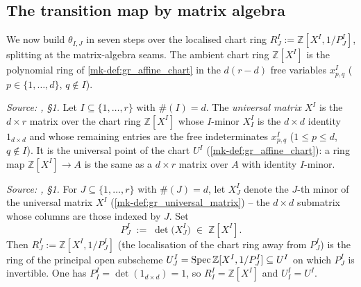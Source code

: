 \subsection*{The transition map by matrix algebra}

We now build \(\theta_{I,J}\) in seven steps over the localised chart ring
\(R^I_J := \mathbb{Z}[X^I, 1/P^I_J]\), splitting at the matrix-algebra seams. The
ambient chart ring \(\mathbb{Z}[X^I]\) is the polynomial ring of
\ref{mk-def:gr_affine_chart} in the \(d(r-d)\) free variables \(x^I_{p,q}\)
(\(p \in \{1,\dots,d\}\), \(q \notin I\)).

\begin{definition}\label{mk-def:gr_universal_matrix}
  \leanok

  \textit{Source: \cite{nitsure-hilbert-quot}, \S 1.}
  Let \(I \subseteq \{1,\dots,r\}\) with \(\#(I) = d\). The \emph{universal
  matrix} \(X^I\) is the \(d \times r\) matrix over the chart ring
  \(\mathbb{Z}[X^I]\) whose \(I\)-minor \(X^I_I\) is the \(d \times d\) identity
  \(1_{d\times d}\) and whose remaining entries are the free indeterminates
  \(x^I_{p,q}\) (\(1 \le p \le d\), \(q \notin I\)). It is the universal point of
  the chart \(U^I\) (\ref{mk-def:gr_affine_chart}): a ring map
  \(\mathbb{Z}[X^I] \to A\) is the same as a \(d \times r\) matrix over \(A\)
  with identity \(I\)-minor.
\end{definition}

\begin{definition}\label{mk-def:gr_minor_det}
  \leanok

  \textit{Source: \cite{nitsure-hilbert-quot}, \S 1.}
  For \(J \subseteq \{1,\dots,r\}\) with \(\#(J) = d\), let \(X^I_J\) denote the
  \(J\)-th minor of the universal matrix \(X^I\) (\ref{mk-def:gr_universal_matrix})
  -- the \(d \times d\) submatrix whose columns are those indexed by \(J\). Set
  \[
    P^I_J \;:=\; \det\bigl(X^I_J\bigr) \;\in\; \mathbb{Z}[X^I].
  \]
  Then \(R^I_J := \mathbb{Z}[X^I, 1/P^I_J]\) (the localisation of the chart ring
  away from \(P^I_J\)) is the ring of the principal open subscheme
  \(U^I_J = \operatorname{Spec} \mathbb{Z}[X^I, 1/P^I_J] \subseteq U^I\) on which \(P^I_J\) is
  invertible. One has \(P^I_I = \det(1_{d\times d}) = 1\), so \(R^I_I =
  \mathbb{Z}[X^I]\) and \(U^I_I = U^I\).
\end{definition}

